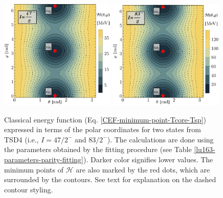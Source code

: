 \begin{figure}
    \centering
    \includegraphics[width=0.49\textwidth]{Chapters/Figures/parity-partners-plots/contour-tsd4-1.pdf}
    \includegraphics[width=0.49\textwidth]{Chapters/Figures/parity-partners-plots/contour-tsd4-2.pdf}
    \caption{Classical energy function (Eq. \ref{CEF-minimum-point-Tcore-Tsp}) expressed in terms of the polar coordinates for two states from TSD4 (i.e., $I=47/2^-$ and $83/2^-$). The calculations are done using the parameters obtained by the fitting procedure (see Table \ref{lu163-parameters-parity-fitting}). Darker color signifies lower values. The minimum points of $\mathcal{H}$ are also marked by the red dots, which are surrounded by the contours. See text for explanation on the dashed contour styling.}
    \label{contour-cef-polar-tsd4}
\end{figure}

